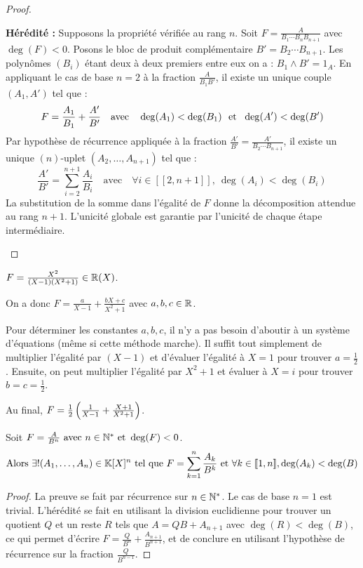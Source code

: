 \documentclass[12pt, a4paper]{report}
\begin{document}
\begin{proof}
\begin{outline}
        \1 \textbf{Hérédité :}
            \2 Supposons la propriété vérifiée au rang $n$. Soit $F = \frac{A}{B_1 \cdots B_n B_{n+1}}$ avec $\deg(F) < 0$.
            \2 Posons le bloc de produit complémentaire $B' = B_2 \cdots B_{n+1}$. 
            \2 Les polynômes $(B_i)$ étant deux à deux premiers entre eux on a : $B_1 \wedge B' = 1_A$.
            \2 En appliquant le cas de base $n=2$ à la fraction $\frac{A}{B_1 B'}$, il existe un unique couple $(A_1, A')$ tel que :
               \[ F = \frac{A_1}{B_1} + \frac{A'}{B'} \quad \text{avec} \quad \deg(A_1) < \deg(B_1) \ \et \ \deg(A') < \deg(B') \]
            \2 Par hypothèse de récurrence appliquée à la fraction $\frac{A'}{B'} = \frac{A'}{B_2 \cdots B_{n+1}}$, il existe un unique $(n)$-uplet $(A_2, \dots, A_{n+1})$ tel que :
               \[ \frac{A'}{B'} = \sum_{i=2}^{n+1} \frac{A_i}{B_i} \quad \text{avec} \quad \forall i \in [\![2, n+1]\!], \ \deg(A_i) < \deg(B_i) \]
            \2 La substitution de la somme dans l'égalité de $F$ donne la décomposition attendue au rang $n+1$. L'unicité globale est garantie par l'unicité de chaque étape intermédiaire.
    \end{outline}
\end{proof}

\begin{example}
    $F = \frac{X^2}{(X-1)(X^2+1)} \in \mathbb{R}(X)$.

    On a donc $F = \frac{a}{X-1} + \frac{bX + c}{X^2 + 1}$ avec $a, b, c \in \mathbb{R}$.

    Pour déterminer les constantes $a,b,c$, il n'y a pas besoin d'aboutir à un système d'équations (même si cette méthode marche). Il suffit tout simplement de multiplier l'égalité par $(X-1)$ et d'évaluer l'égalité à $X=1$ pour trouver $a=\frac12$. Ensuite, on peut multiplier l'égalité par $X^2 + 1$ et évaluer à $X=i$ pour trouver $b=c=\frac12$.

    Au final, $F = \frac12 \left(\frac{1}{X-1} + \frac{X+1}{X^2 + 1}\right)$.
\end{example}

\begin{property}
    Soit $F=\frac{A}{B^n} \text{ avec } n \in \mathbb{N}^* \text{ et } \deg(F) < 0$.
    $$\text{Alors } \exists ! (A_1, \dots, A_n) \in \mathbb{K}[X]^n \text{ tel que } F = \sum_{k=1}^{n} \frac{A_k}{B^k} \text{ et } \forall k \in [\![1,n]\!], \deg(A_k) < \deg(B)$$
\end{property}

\begin{proof}
    La preuve se fait par récurrence sur $n \in \mathbb{N}^*$. Le cas de base $n=1$ est trivial. L'hérédité se fait en utilisant la division euclidienne pour trouver un quotient $Q$ et un reste $R$ tels que $A = QB + A_{n+1}$ avec $\deg(R) < \deg(B)$, ce qui permet d'écrire $F = \frac{Q}{B^n} + \frac{A_{n+1}}{B^{n+1}}$, et de conclure en utilisant l'hypothèse de récurrence sur la fraction $\frac{Q}{B^{n-1}}$.
\end{proof}
\end{document}
